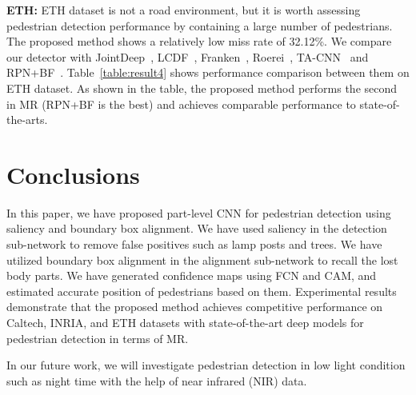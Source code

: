 \documentclass[journal]{IEEEtran}
\begin{document}
 \textbf{ETH:} ETH dataset is not a road environment, but it is worth assessing pedestrian detection performance by containing a large number of pedestrians. The proposed method shows a relatively low miss rate of 32.12\%. We compare our detector with JointDeep~\cite{ouyang2013joint}, LCDF~\cite{nam2014local}, Franken~\cite{mathias2013handling}, Roerei~\cite{benenson2013seeking}, TA-CNN~\cite{tian2015pedestrian} and RPN+BF~\cite{zhang2016faster}. Table~\ref{table:result4} shows performance comparison between them on ETH dataset. As shown in the table, the proposed method performs the second in MR (RPN+BF is the best) and achieves comparable performance to state-of-the-arts.


\section{Conclusions}
\label{sec:Conclusion}

In this paper, we have proposed part-level CNN for pedestrian detection using saliency and boundary box alignment. We have used saliency in the detection sub-network to remove false positives such as lamp posts and trees. We have utilized boundary box alignment in the alignment sub-network to recall the lost body parts. We have generated confidence maps using FCN and CAM, and estimated accurate position of pedestrians based on them. Experimental results demonstrate that the proposed method achieves competitive performance on Caltech, INRIA, and ETH datasets with state-of-the-art deep models for pedestrian detection in terms of MR.

In our future work, we will investigate pedestrian detection in low light condition such as night time with the help of near infrared (NIR) data.  



















\ifCLASSOPTIONcaptionsoff
  \newpage
\fi
\end{document}
